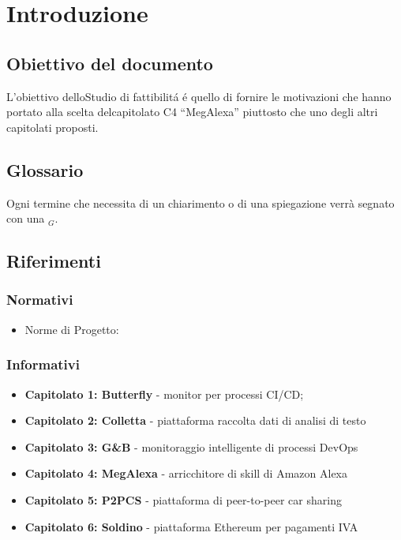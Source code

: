 \chapter{Introduzione}
\section{Obiettivo del documento}
L’obiettivo delloStudio di fattibilit\'a \'e quello di fornire le motivazioni che hanno portato alla scelta delcapitolato C4 “MegAlexa” piuttosto che uno degli altri capitolati proposti.
\section{Glossario} 
Ogni termine che necessita di un chiarimento o di una spiegazione verrà segnato con una $_{G}$.
\section{Riferimenti}
\subsection{Normativi}
\begin{itemize}
	\item Norme di Progetto: %
\end{itemize}
\subsection{Informativi}
\begin{itemize}
\item \textbf{Capitolato 1: Butterfly} - monitor per processi CI/CD;
\item \textbf{Capitolato 2: Colletta} - piattaforma raccolta dati di analisi di testo
\item \textbf{Capitolato 3: G\&B} - monitoraggio intelligente di processi DevOps
\item \textbf{Capitolato 4: MegAlexa} - arricchitore di skill di Amazon Alexa
\item \textbf{Capitolato 5: P2PCS} - piattaforma di peer-to-peer car sharing
\item \textbf{Capitolato 6: Soldino} - piattaforma Ethereum per pagamenti IVA

\end{itemize}
